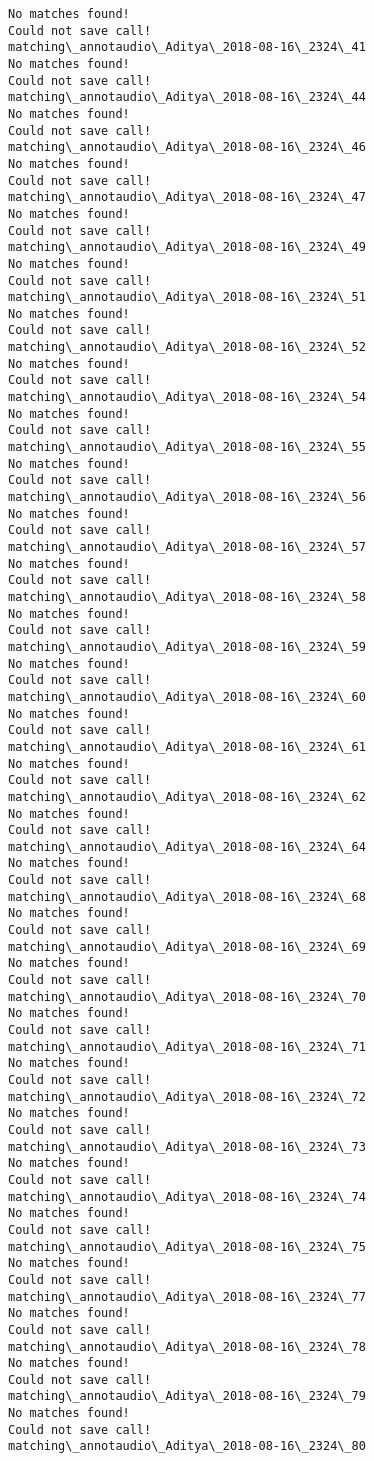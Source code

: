 \documentclass[11pt]{article}
\begin{document}
\begin{Verbatim}[commandchars=\\\{\}]
No matches found!
Could not save call!
matching\_annotaudio\_Aditya\_2018-08-16\_2324\_41
No matches found!
Could not save call!
matching\_annotaudio\_Aditya\_2018-08-16\_2324\_44
No matches found!
Could not save call!
matching\_annotaudio\_Aditya\_2018-08-16\_2324\_46
No matches found!
Could not save call!
matching\_annotaudio\_Aditya\_2018-08-16\_2324\_47
No matches found!
Could not save call!
matching\_annotaudio\_Aditya\_2018-08-16\_2324\_49
No matches found!
Could not save call!
matching\_annotaudio\_Aditya\_2018-08-16\_2324\_51
No matches found!
Could not save call!
matching\_annotaudio\_Aditya\_2018-08-16\_2324\_52
No matches found!
Could not save call!
matching\_annotaudio\_Aditya\_2018-08-16\_2324\_54
No matches found!
Could not save call!
matching\_annotaudio\_Aditya\_2018-08-16\_2324\_55
No matches found!
Could not save call!
matching\_annotaudio\_Aditya\_2018-08-16\_2324\_56
No matches found!
Could not save call!
matching\_annotaudio\_Aditya\_2018-08-16\_2324\_57
No matches found!
Could not save call!
matching\_annotaudio\_Aditya\_2018-08-16\_2324\_58
No matches found!
Could not save call!
matching\_annotaudio\_Aditya\_2018-08-16\_2324\_59
No matches found!
Could not save call!
matching\_annotaudio\_Aditya\_2018-08-16\_2324\_60
No matches found!
Could not save call!
matching\_annotaudio\_Aditya\_2018-08-16\_2324\_61
No matches found!
Could not save call!
matching\_annotaudio\_Aditya\_2018-08-16\_2324\_62
No matches found!
Could not save call!
matching\_annotaudio\_Aditya\_2018-08-16\_2324\_64
No matches found!
Could not save call!
matching\_annotaudio\_Aditya\_2018-08-16\_2324\_68
No matches found!
Could not save call!
matching\_annotaudio\_Aditya\_2018-08-16\_2324\_69
No matches found!
Could not save call!
matching\_annotaudio\_Aditya\_2018-08-16\_2324\_70
No matches found!
Could not save call!
matching\_annotaudio\_Aditya\_2018-08-16\_2324\_71
No matches found!
Could not save call!
matching\_annotaudio\_Aditya\_2018-08-16\_2324\_72
No matches found!
Could not save call!
matching\_annotaudio\_Aditya\_2018-08-16\_2324\_73
No matches found!
Could not save call!
matching\_annotaudio\_Aditya\_2018-08-16\_2324\_74
No matches found!
Could not save call!
matching\_annotaudio\_Aditya\_2018-08-16\_2324\_75
No matches found!
Could not save call!
matching\_annotaudio\_Aditya\_2018-08-16\_2324\_77
No matches found!
Could not save call!
matching\_annotaudio\_Aditya\_2018-08-16\_2324\_78
No matches found!
Could not save call!
matching\_annotaudio\_Aditya\_2018-08-16\_2324\_79
No matches found!
Could not save call!
matching\_annotaudio\_Aditya\_2018-08-16\_2324\_80

\end{Verbatim}
\end{document}
